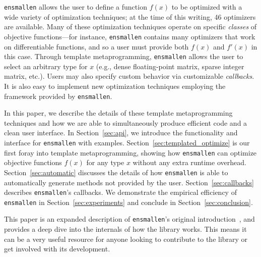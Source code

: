 {\tt ensmallen} allows the user to define a function $f(x)$ to be optimized with
a wide variety of optimization techniques; at the time of this writing, 46
optimizers are available.  Many of these optimization techniques operate on
specific {\it classes} of objective functions---for instance, {\tt ensmallen}
contains many optimizers that work on differentiable functions, and so a user
must provide both $f(x)$ and $f'(x)$ in this case.
Through template metaprogramming, {\tt ensmallen} allows the user to select
an arbitrary type for $x$ (e.g., dense floating-point matrix, sparse integer matrix, etc.).
Users may also specify custom behavior via customizable {\it callbacks}.
It is also easy to implement new optimization techniques employing the framework provided by {\tt ensmallen}.

In this paper, we describe the details of these template metaprogramming
techniques and how we are able to simultaneously produce efficient code and a
clean user interface.  In Section~\ref{sec:api}, we introduce the functionality
and interface for {\tt ensmallen} with examples.
Section~\ref{sec:templated_optimize} is our first foray into template
metaprogramming, showing how {\tt ensmallen} can optimize objective functions
$f(x)$ for any type $x$ without any extra runtime overhead.
Section~\ref{sec:automatic} discusses the details of how {\tt ensmallen} is able
to automatically generate methods not provided by the user.
Section~\ref{sec:callbacks} describes {\tt ensmallen}'s callbacks.
We demonstrate the empirical efficiency of {\tt ensmallen} in
Section~\ref{sec:experiments} and conclude in Section~\ref{sec:conclusion}.

This paper is an expanded description of {\tt ensmallen}'s original
introduction~\cite{ensmallen2018, curtin2017generic}, and provides a deep dive
into the internals of how the library works.  This means it can be a very useful
resource for anyone looking to contribute to the library or get involved with
its development.
